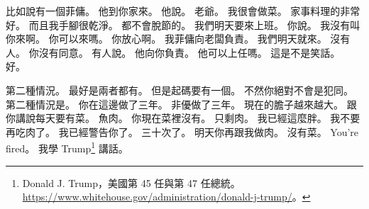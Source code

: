 \hypertarget{c01:cue:1234}{}比如說有一個菲傭。
\hypertarget{c01:cue:1235}{}他到你家來。
\hypertarget{c01:cue:1236}{}他說。
\hypertarget{c01:cue:1237}{}老爺。
\hypertarget{c01:cue:1238}{}我很會做菜。
\hypertarget{c01:cue:1239}{}家事料理的非常好。
\hypertarget{c01:cue:1240}{}而且我手腳很乾淨。
\hypertarget{c01:cue:1241}{}都不會脫節的。
\hypertarget{c01:cue:1242}{}我們明天要來上班。
\hypertarget{c01:cue:1243}{}你說。
\hypertarget{c01:cue:1244}{}我沒有叫你來啊。
\hypertarget{c01:cue:1245}{}你可以來嗎。
\hypertarget{c01:cue:1246}{}你放心啊。
\hypertarget{c01:cue:1247}{}我菲傭向老闆負責。
\hypertarget{c01:cue:1248}{}我們明天就來。
\hypertarget{c01:cue:1249}{}沒有人。
\hypertarget{c01:cue:1250}{}你沒有同意。
\hypertarget{c01:cue:1251}{}有人說。
\hypertarget{c01:cue:1252}{}他向你負責。
\hypertarget{c01:cue:1253}{}他可以上任嗎。
\hypertarget{c01:cue:1254}{}這是不是笑話。
\hypertarget{c01:cue:1255}{}好。

\hypertarget{c01:cue:1256}{}第二種情況。
\hypertarget{c01:cue:1257}{}最好是兩者都有。
\hypertarget{c01:cue:1258}{}但是起碼要有一個。
\hypertarget{c01:cue:1259}{}不然你絕對不會是犯同。
\hypertarget{c01:cue:1260}{}第二種情況是。
\hypertarget{c01:cue:1261}{}你在這邊做了三年。
\hypertarget{c01:cue:1262}{}非優做了三年。
\hypertarget{c01:cue:1263}{}現在的膽子越來越大。
\hypertarget{c01:cue:1264}{}跟你講說每天要有菜。
\hypertarget{c01:cue:1265}{}魚肉。
\hypertarget{c01:cue:1266}{}你現在菜裡沒有。
\hypertarget{c01:cue:1267}{}只剩肉。
\hypertarget{c01:cue:1268}{}我已經這麼胖。
\hypertarget{c01:cue:1269}{}我不要再吃肉了。
\hypertarget{c01:cue:1270}{}我已經警告你了。
\hypertarget{c01:cue:1271}{}三十次了。
\hypertarget{c01:cue:1272}{}明天你再跟我做肉。
\hypertarget{c01:cue:1273}{}沒有菜。
\hypertarget{c01:cue:1274}{}You're fired。
\hypertarget{c01:cue:1275}{}我學 Trump\footnote{Donald J. Trump，美國第 45 任與第 47 任總統。\url{https://www.whitehouse.gov/administration/donald-j-trump/}。} 講話。

